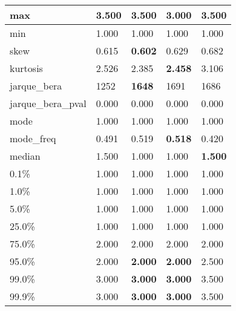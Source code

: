 \begin{table}[H]
\begin{tabular}{|l|m{10em}|m{10em}|m{10em}|m{10em}|}
\hline max & 3.500 & \bfseries 3.500 & \cellcolor[rgb]{0.9, 0.54, 0.52} 3.000 & \bfseries 3.500 \\
\hline min & 1.000 & 1.000 & 1.000 & 1.000 \\
\hline skew & 0.615 & \bfseries 0.602 & 0.629 & \cellcolor[rgb]{0.9, 0.54, 0.52} 0.682 \\
\hline kurtosis & 2.526 & 2.385 & \bfseries 2.458 & \cellcolor[rgb]{0.9, 0.54, 0.52} 3.106 \\
\hline jarque\_bera & 1252 & \bfseries 1648 & \cellcolor[rgb]{0.9, 0.54, 0.52} 1691 & 1686 \\
\hline jarque\_bera\_pval & 0.000 & 0.000 & 0.000 & 0.000 \\
\hline mode & 1.000 & 1.000 & 1.000 & 1.000 \\
\hline mode\_freq & 0.491 & 0.519 & \bfseries 0.518 & \cellcolor[rgb]{0.9, 0.54, 0.52} 0.420 \\
\hline median & 1.500 & \cellcolor[rgb]{0.9, 0.54, 0.52} 1.000 & \cellcolor[rgb]{0.9, 0.54, 0.52} 1.000 & \bfseries 1.500 \\
\hline 0.1\% & 1.000 & 1.000 & 1.000 & 1.000 \\
\hline 1.0\% & 1.000 & 1.000 & 1.000 & 1.000 \\
\hline 5.0\% & 1.000 & 1.000 & 1.000 & 1.000 \\
\hline 25.0\% & 1.000 & 1.000 & 1.000 & 1.000 \\
\hline 75.0\% & 2.000 & 2.000 & 2.000 & 2.000 \\
\hline 95.0\% & 2.000 & \bfseries 2.000 & \bfseries 2.000 & \cellcolor[rgb]{0.9, 0.54, 0.52} 2.500 \\
\hline 99.0\% & 3.000 & \bfseries 3.000 & \bfseries 3.000 & \cellcolor[rgb]{0.9, 0.54, 0.52} 3.500 \\
\hline 99.9\% & 3.000 & \bfseries 3.000 & \bfseries 3.000 & \cellcolor[rgb]{0.9, 0.54, 0.52} 3.500 \\
\hline
\end{tabular}
\end{table}
